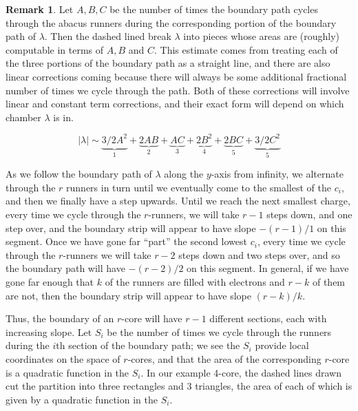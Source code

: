 \documentclass{amsart}[12pt]
\theoremstyle{definition}
\newtheorem{remark}[dummy]{Remark}
\begin{document}
\begin{remark}
\begin{tikzpicture}[scale=.3]
  \end{tikzpicture}
  Let $A, B, C$ be the number of times the boundary path cycles through the abacus runners during the corresponding portion of the boundary path of $\lambda$.  Then the dashed lined break $\lambda$ into pieces whose areas are (roughly) computable in terms of $A, B$ and $C$.  This estimate comes from treating each of the three portions of the boundary path as a straight line, and there are also linear corrections coming because there will always be some additional fractional number of times we cycle through the path.   Both of these corrections will involve linear and constant term corrections, and their exact form will depend on which chamber $\lambda$ is in.  


  
  \begin{equation*}
|\lambda|\sim \underbrace{3/2 A^2 }_{1}+\underbrace{2AB}_2+\underbrace{AC}_3+\underbrace{2B^2}_4+\underbrace{2BC}_5+\underbrace{3/2 C^2}_5
  \end{equation*}

  

As we follow the boundary path of $\lambda$ along the $y$-axis from infinity, we alternate through the $r$ runners in turn until we eventually come to the smallest of the $c_i$, and then we finally have a step upwards.  Until we reach the next smallest charge, every time we cycle through the $r$-runners, we will take $r-1$ steps down, and one step over, and the boundary strip will appear to have slope $-(r-1)/1$ on this segment.  Once we have gone far ``part'' the second lowest $c_i$, every time we cycle through the $r$-runners we will take $r-2$ steps down and two steps over, and so the boundary path will have $-(r-2)/2$ on this segment.  In general, if we have gone far enough that $k$ of the runners are filled with electrons and $r-k$ of them are not, then the boundary strip will appear to have slope $(r-k)/k$.

Thus, the boundary of an $r$-core will have $r-1$ different sections, each with increasing slope.  Let $S_i$ be the number of times we cycle through the runners during the $i$th section of the boundary path; we see the $S_i$ provide local coordinates on the space of $r$-cores, and that the area of the corresponding $r$-core is a quadratic function in the $S_i$.  In our example 4-core, the dashed lines drawn cut the partition into three rectangles and 3 triangles, the area of each of which is given by a quadratic function in the $S_i$.



\end{remark}
\end{document}
